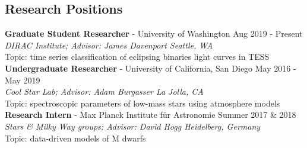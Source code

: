 \documentclass[margin,line]{resume}
\begin{document}
\begin{resume}

\section{\mysidestyle \textcolor{bcolor}{Research Positions}}

\textbf{Graduate Student Researcher} - University of Washington \hfill Aug 2019 - Present \\
\-\hspace{.25cm} \textit{DIRAC Institute; Advisor: James Davenport \hfill Seattle, WA} \\
\-\hspace{.25cm} Topic: time series classification of eclipsing binaries light curves in TESS
\vspace{.2cm} \newline
\textbf{Undergraduate Researcher} - University of California, San Diego \hfill May 2016 - May 2019  \\
\-\hspace{.25cm} \textit{Cool Star Lab; Advisor: Adam Burgasser \hfill La Jolla, CA} \\ 
\-\hspace{.25cm} Topic: spectroscopic parameters of low-mass stars using atmosphere models 
\vspace{.2cm} \newline
\textbf{Research Intern} - Max Planck Institute f{\"u}r Astronomie \hfill Summer 2017 \& 2018 \\
\-\hspace{.25cm} \textit{Stars \& Milky Way groups; Advisor: David Hogg \hfill Heidelberg, Germany} \\
\-\hspace{.25cm} Topic: data-driven models of M dwarfs




\end{resume}
\end{document}
